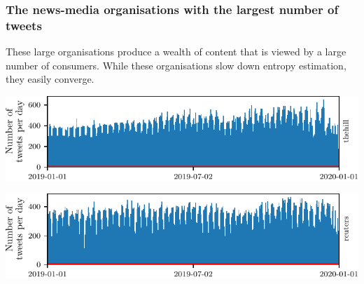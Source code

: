 











\subsubsection{The news-media organisations with the largest number of tweets}

These large organisations produce a wealth of content that is viewed by a large number of consumers. While these organisations slow down entropy estimation, they easily converge.


\begin{center}

\includegraphics{appendix2/figs/tweet_times/thehill.pdf}
\end{center}

\begin{center}

\includegraphics{appendix2/figs/tweet_times/reuters.pdf}
\end{center}


